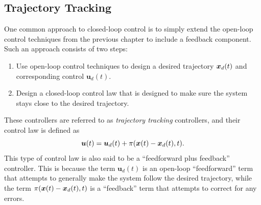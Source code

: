 \subsection{Trajectory Tracking}
One common approach to closed-loop control is to simply extend the open-loop control techniques from the previous chapter to include a feedback component. Such an approach consists of two steps:
\begin{enumerate}
    \item Use open-loop control techniques to design a desired trajectory $\bm{x}_d(t)$ and corresponding control $\bm{u}_d(t)$.
    \item Design a closed-loop control law that is designed to make sure the system stays close to the desired trajectory.
\end{enumerate}
These controllers are referred to as \textit{trajectory tracking} controllers, and their control law is defined as
\begin{equation}
\bm{u}(t) =  \bm{u}_d(t)+\pi(\bm{x}(t)-\bm{x}_d(t),t).
\end{equation}
This type of control law is also said to be a ``feedforward plus feedback'' controller. This is because the term $\bm{u}_d(t)$ is an open-loop ``feedforward'' term that attempts to generally make the system follow the desired trajectory, while the term $\pi(\bm{x}(t)-\bm{x}_d(t),t)$ is a ``feedback'' term that attempts to correct for any errors. 

